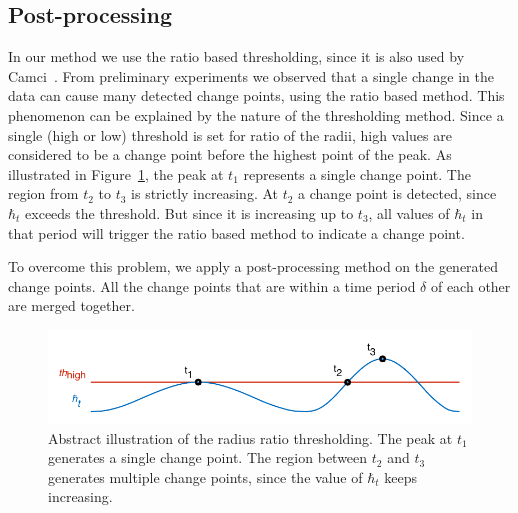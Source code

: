 \subsection{Post-processing}
In our method we use the ratio based thresholding, since it is also used by Camci~\cite{camci2010change}.
From preliminary experiments we observed that a single change in the data can cause many detected change points, using the ratio based method.
This phenomenon can be explained by the nature of the thresholding method.
Since a single (high or low) threshold is set for ratio of the radii, high values are considered to be a change point before the highest point of the peak.
As illustrated in Figure~\ref{fig:tresholding}, the peak at $t_1$ represents a single change point.
The region from $t_2$ to $t_3$ is strictly increasing.
At $t_2$ a change point is detected, since $\hbar_t$ exceeds the threshold.
But since it is increasing up to $t_3$, all values of $\hbar_t$ in that period will trigger the ratio based method to indicate a change point.

To overcome this problem, we apply a post-processing method on the generated change points.
All the change points that are within a time period $\delta$ of each other are merged together.

\begin{figure}
  \centering
    \includegraphics[width=\textwidth,height=\textheight,keepaspectratio]{./Figures/chapter4/signal_threshold.pdf}
  \caption[Thresholding]{Abstract illustration of the radius ratio thresholding. The peak at $t_1$ generates a single change point. The region between $t_2$ and $t_3$ generates multiple change points, since the value of $\hbar_t$ keeps increasing.}
  \label{fig:tresholding}
\end{figure}